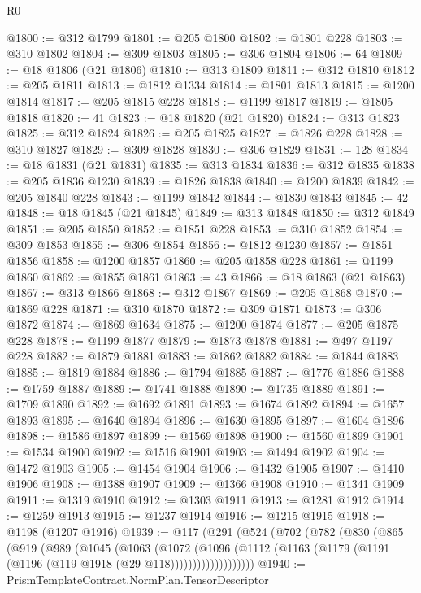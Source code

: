 \begin{lexlean}{R0}
\begin{coremodule}
@1800 := @312 @1799
@1801 := @205 @1800
@1802 := @1801 @228
@1803 := @310 @1802
@1804 := @309 @1803
@1805 := @306 @1804
@1806 := 64
@1809 := @18 @1806 (@21 @1806)
@1810 := @313 @1809
@1811 := @312 @1810
@1812 := @205 @1811
@1813 := @1812 @1334
@1814 := @1801 @1813
@1815 := @1200 @1814
@1817 := @205 @1815 @228
@1818 := @1199 @1817
@1819 := @1805 @1818
@1820 := 41
@1823 := @18 @1820 (@21 @1820)
@1824 := @313 @1823
@1825 := @312 @1824
@1826 := @205 @1825
@1827 := @1826 @228
@1828 := @310 @1827
@1829 := @309 @1828
@1830 := @306 @1829
@1831 := 128
@1834 := @18 @1831 (@21 @1831)
@1835 := @313 @1834
@1836 := @312 @1835
@1838 := @205 @1836 @1230
@1839 := @1826 @1838
@1840 := @1200 @1839
@1842 := @205 @1840 @228
@1843 := @1199 @1842
@1844 := @1830 @1843
@1845 := 42
@1848 := @18 @1845 (@21 @1845)
@1849 := @313 @1848
@1850 := @312 @1849
@1851 := @205 @1850
@1852 := @1851 @228
@1853 := @310 @1852
@1854 := @309 @1853
@1855 := @306 @1854
@1856 := @1812 @1230
@1857 := @1851 @1856
@1858 := @1200 @1857
@1860 := @205 @1858 @228
@1861 := @1199 @1860
@1862 := @1855 @1861
@1863 := 43
@1866 := @18 @1863 (@21 @1863)
@1867 := @313 @1866
@1868 := @312 @1867
@1869 := @205 @1868
@1870 := @1869 @228
@1871 := @310 @1870
@1872 := @309 @1871
@1873 := @306 @1872
@1874 := @1869 @1634
@1875 := @1200 @1874
@1877 := @205 @1875 @228
@1878 := @1199 @1877
@1879 := @1873 @1878
@1881 := @497 @1197 @228
@1882 := @1879 @1881
@1883 := @1862 @1882
@1884 := @1844 @1883
@1885 := @1819 @1884
@1886 := @1794 @1885
@1887 := @1776 @1886
@1888 := @1759 @1887
@1889 := @1741 @1888
@1890 := @1735 @1889
@1891 := @1709 @1890
@1892 := @1692 @1891
@1893 := @1674 @1892
@1894 := @1657 @1893
@1895 := @1640 @1894
@1896 := @1630 @1895
@1897 := @1604 @1896
@1898 := @1586 @1897
@1899 := @1569 @1898
@1900 := @1560 @1899
@1901 := @1534 @1900
@1902 := @1516 @1901
@1903 := @1494 @1902
@1904 := @1472 @1903
@1905 := @1454 @1904
@1906 := @1432 @1905
@1907 := @1410 @1906
@1908 := @1388 @1907
@1909 := @1366 @1908
@1910 := @1341 @1909
@1911 := @1319 @1910
@1912 := @1303 @1911
@1913 := @1281 @1912
@1914 := @1259 @1913
@1915 := @1237 @1914
@1916 := @1215 @1915
@1918 := @1198 (@1207 @1916)
@1939 := @117
    (@291
      (@524
        (@702
          (@782
            (@830
              (@865
                (@919
                  (@989
                    (@1045
                      (@1063
                        (@1072
                          (@1096
                            (@1112
                              (@1163 (@1179 (@1191 (@1196 (@119 @1918 (@29 @118)))))))))))))))))))
@1940 := PrismTemplateContract.NormPlan.TensorDescriptor

\end{coremodule}
\end{lexlean}
